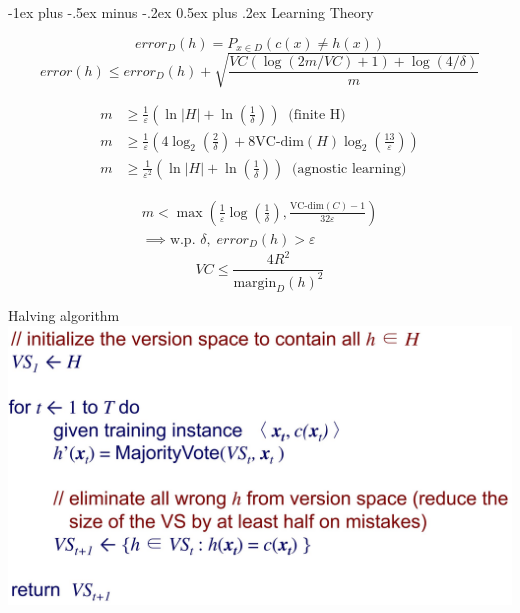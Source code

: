 \documentclass[10pt,landscape]{article}
\makeatletter
\renewcommand{\section}{\@startsection{section}{1}{0mm}%
{-1ex plus -.5ex minus -.2ex}%
{0.5ex plus .2ex}%
{\normalfont\large\bfseries}}
\makeatother
\begin{document}
\begin{multicols}{4}
    \section{Learning Theory}
    
    \begin{equation*}
        error_{D}(h) = P_{x \in D} \left( c(x) \neq h(x)\right)
    \end{equation*}
    \begin{equation*}
        error(h) \leq error_D(h) + \sqrt{\frac{VC (\log(2m/VC) + 1) + \log(4/\delta)}{m}}
    \end{equation*}
    
    \begin{align*}
        m &\geq \frac{1}{\varepsilon} \left( \ln |H| + \ln \left(\frac{1}{\delta} \right) \right)
        \;\;(\textrm{finite H)}
        \\
        m &\geq \frac{1}{\varepsilon} \left( 4 \log_2 \left(\frac{2}{\delta} \right) + 8 \text{VC-dim}(H) \log_2 \left(\frac{13}{\varepsilon} \right) \right)
        \\
        m &\geq \frac{1}{\varepsilon^2} \left( \ln |H| + \ln \left(\frac{1}{\delta} \right) \right)
        \;\;\text{(agnostic learning)}
    \end{align*}
    
    \begin{align*}
        m < \max \left( \frac{1}{\varepsilon} \log \left(\frac{1}{\delta}\right), \frac{\text{VC-dim}(C) -1}{32\varepsilon}\right) \\
        \implies \text{w.p. } \delta, \; error_D(h) > \varepsilon
    \end{align*}
    \begin{equation*}
        VC \leq \frac{4R^2}{\text{margin}_D(h)^2}
    \end{equation*}
    
    {
        \centering
        Halving algorithm
        \includegraphics[width=0.8\linewidth]{snips/28_halving-algorithm.jpg}
    
}
\end{multicols}
\end{document}

